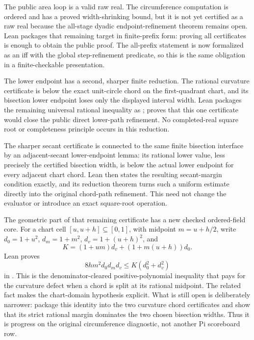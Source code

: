 \begin{theorem}
The public area loop is a valid raw real.  The circumference computation is
ordered and has a proved width-shrinking bound, but it is not yet certified as
a raw real because the all-stage dyadic endpoint-refinement theorem remains
open.  Lean packages that remaining target in finite-prefix form: proving all
 certificates is enough to
obtain the public  proof.  The all-prefix statement is
now formalized as an iff with the global step-refinement predicate, so this is
the same obligation in a finite-checkable presentation.

The lower endpoint has a second, sharper finite reduction.  The rational
curvature certificate  is below the exact
unit-circle chord on the first-quadrant chart, and its bisection lower endpoint
loses only the displayed interval width.  Lean packages the remaining
universal rational inequality as
;
proves that this one certificate would close the public direct lower-path
refinement.  No completed-real square root or completeness principle occurs in
this reduction.

The sharper secant certificate is connected to the same finite bisection
interface by an adjacent-secant lower-endpoint lemma: its rational lower value,
less precisely the certified bisection width, is below the actual lower
endpoint for every adjacent chart chord.  Lean then states the resulting
secant-margin condition exactly, and its reduction theorem turns such a
uniform estimate directly into the original chord-path refinement.  This need
not change the evaluator or introduce an exact square-root operation.

The geometric part of that remaining certificate has a new checked
ordered-field core.  For a chart cell \([u,u+h]\subseteq[0,1]\), with midpoint
\(m=u+h/2\), write \(d_0=1+u^2\), \(d_m=1+m^2\),
\(d_v=1+(u+h)^2\), and
\[
 K=(1+um)d_v+(1+m(u+h))d_0.
\]
Lean proves
\[
  8hm^2d_0d_md_v \le K(d_0^2+d_v^2)
\]
in .  This is
the denominator-cleared positive-polynomial inequality that pays for the
curvature defect when a chord is split at its rational midpoint.  The related
fact  makes the chart-domain
hypothesis explicit.  What is still open is deliberately narrower: package
this identity into the two curvature chord certificates and show that its
strict rational margin dominates the two chosen bisection widths.  Thus it is
progress on the original circumference diagnostic, not another Pi scoreboard
row.


\end{theorem}
